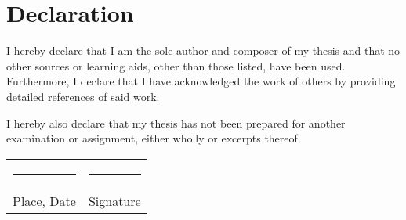 \chapter*{Declaration}

I hereby declare that I am the sole author and composer of my thesis and that no other sources or learning aids, other than those listed, have been used. Furthermore, I declare that I have acknowledged the work of others by providing detailed references of said work.

I hereby also declare that my thesis has not been prepared for another examination or assignment, either wholly or excerpts thereof.

\vspace{3\normalbaselineskip}

\begin{tabular}{p{} p{}}
    \rule{0.33\textwidth}{0.4pt} & \rule{0.33\textwidth}{0.4pt} \\
    Place, Date                  & Signature
\end{tabular}
